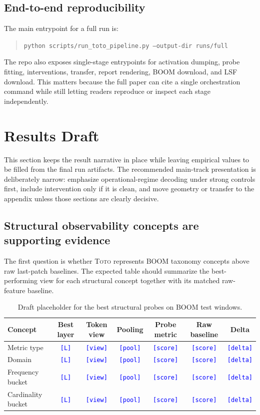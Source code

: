\documentclass{article}
\newcommand{\tbd}[1]{\textcolor{blue}{\texttt{[#1]}}}
\newcommand{\model}{\textsc{Toto}}
\newcommand{\boom}{\textsc{BOOM}}
\newcommand{\lsf}{\textsc{LSF}}
\begin{document}
\subsection{End-to-end reproducibility}

The main entrypoint for a full run is:
\begin{quote}
\texttt{python scripts/run\_toto\_pipeline.py --output-dir runs/full}
\end{quote}

The repo also exposes single-stage entrypoints for activation dumping, probe fitting, interventions, transfer, report rendering, \boom{} download, and \lsf{} download. This matters because the full paper can cite a single orchestration command while still letting readers reproduce or inspect each stage independently.

\section{Results Draft}
\label{sec:results}

This section keeps the result narrative in place while leaving empirical values to be filled from the final run artifacts. The recommended main-track presentation is deliberately narrow: emphasize operational-regime decoding under strong controls first, include intervention only if it is clean, and move geometry or transfer to the appendix unless those sections are clearly decisive.

\subsection{Structural observability concepts are supporting evidence}

The first question is whether \model{} represents \boom{} taxonomy concepts above raw last-patch baselines. The expected table should summarize the best-performing view for each structural concept together with its matched raw-feature baseline.

\begin{table}[t]
\centering
\small
\begin{tabularx}{\textwidth}{lcccccc}
\toprule
Concept & Best layer & Token view & Pooling & Probe metric & Raw baseline & Delta \\
\midrule
Metric type & \tbd{L} & \tbd{view} & \tbd{pool} & \tbd{score} & \tbd{score} & \tbd{delta} \\
Domain & \tbd{L} & \tbd{view} & \tbd{pool} & \tbd{score} & \tbd{score} & \tbd{delta} \\
Frequency bucket & \tbd{L} & \tbd{view} & \tbd{pool} & \tbd{score} & \tbd{score} & \tbd{delta} \\
Cardinality bucket & \tbd{L} & \tbd{view} & \tbd{pool} & \tbd{score} & \tbd{score} & \tbd{delta} \\
\bottomrule
\end{tabularx}
\caption{Draft placeholder for the best structural probes on \boom{} test windows.}
\label{tab:structural}
\end{table}
\end{document}
